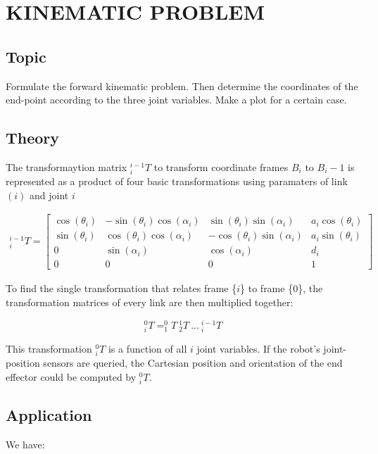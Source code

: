 \chapter{KINEMATIC PROBLEM}

\section{Topic}
Formulate the forward kinematic problem. Then determine the coordinates of the end-point 
according to the three joint variables. Make a plot for a certain case.
 
\section{Theory}

The transformaytion matrix $^{i-1}_{i}T$ to transform coordinate frames \textbf{$B_i$} to \textbf{$B_i - 1$} is represented as a product of four basic transformations using paramaters of link $(i)$ and joint $i$

\begin{align}
^{i-1}_{i}T = 
\begin{bmatrix}
\cos(\theta_i) & -\sin(\theta_i)\cos(\alpha_i) & \sin(\theta_i)\sin(\alpha_i) & a_i\cos(\theta_i) \\
\sin(\theta_i) & \cos(\theta_i)\cos(\alpha_i) & -\cos(\theta_i)\sin(\alpha_i) & a_i\sin(\theta_i) \\
0 & \sin(\alpha_i) & \cos(\alpha_i) & d_i \\
0 & 0 & 0 & 1
\end{bmatrix}
\end{align}

To find the single transformation that relates frame \{$i$\} to frame \{0\}, the transformation matrices of every link are then multiplied together:

\begin{equation}
^{0}_{i}T = ^{0}_{1}T \ ^{1}_{2}T\ ... \ ^{i-1}_{i}T
\end{equation}

This transformation $^{0}_{i}T$ is a function of all $i$ joint variables. If the robot's joint-position sensors are queried, the Cartesian position and orientation of the end effector could be computed by $^{0}_{i}T$.



\section{Application}
We have:

